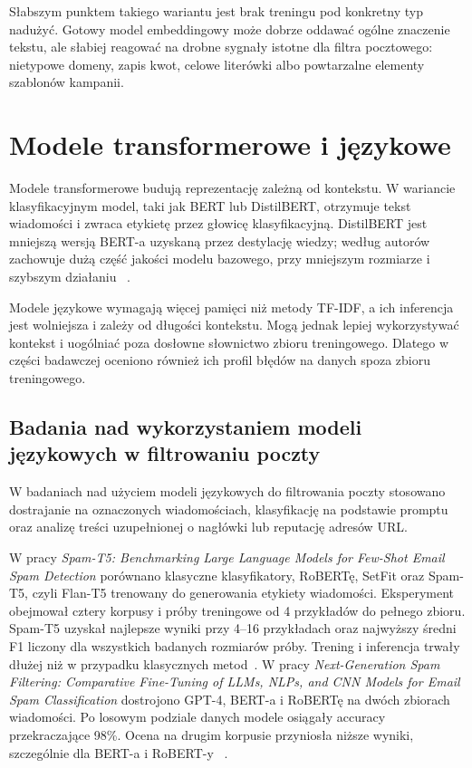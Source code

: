 Słabszym punktem takiego wariantu jest brak treningu pod konkretny typ nadużyć.
Gotowy model embeddingowy może dobrze oddawać ogólne znaczenie tekstu, ale
słabiej reagować na drobne sygnały istotne dla filtra pocztowego: nietypowe
domeny, zapis kwot, celowe literówki albo powtarzalne elementy szablonów
kampanii.

\section{Modele transformerowe i językowe}

Modele transformerowe budują reprezentację zależną od kontekstu. W wariancie
klasyfikacyjnym model, taki jak BERT lub DistilBERT, otrzymuje tekst wiadomości
i zwraca etykietę przez głowicę klasyfikacyjną. DistilBERT jest mniejszą wersją
BERT-a uzyskaną przez destylację wiedzy; według autorów zachowuje dużą część
jakości modelu bazowego, przy mniejszym rozmiarze i szybszym działaniu
~\autocite{sanh-distilbert}.

Modele językowe wymagają więcej pamięci niż metody TF-IDF, a ich inferencja jest
wolniejsza i zależy od długości kontekstu. Mogą jednak lepiej wykorzystywać
kontekst i uogólniać poza dosłowne słownictwo zbioru treningowego. Dlatego w
części badawczej oceniono również ich profil błędów na danych spoza zbioru
treningowego.

\subsection{Badania nad wykorzystaniem modeli językowych w filtrowaniu poczty}

W badaniach nad użyciem modeli językowych do filtrowania poczty stosowano
dostrajanie na oznaczonych wiadomościach, klasyfikację na podstawie promptu oraz
analizę treści uzupełnionej o nagłówki lub reputację adresów URL.

W pracy \emph{Spam-T5: Benchmarking Large Language Models for Few-Shot Email
Spam Detection} porównano klasyczne klasyfikatory, RoBERTę, SetFit oraz Spam-T5,
czyli Flan-T5 trenowany do generowania etykiety wiadomości. Eksperyment
obejmował cztery korpusy i próby treningowe od 4 przykładów do pełnego zbioru.
Spam-T5 uzyskał najlepsze wyniki przy 4--16 przykładach oraz najwyższy średni
F1 liczony dla wszystkich badanych rozmiarów próby. Trening i inferencja trwały
dłużej niż w przypadku klasycznych metod~\autocite{labonne-spam-t5-2023}.
W pracy \emph{Next-Generation Spam Filtering: Comparative Fine-Tuning of LLMs,
NLPs, and CNN Models for Email Spam Classification} dostrojono GPT-4, BERT-a i
RoBERTę na dwóch zbiorach wiadomości. Po losowym podziale danych modele osiągały
accuracy przekraczające 98\%. Ocena na drugim korpusie przyniosła niższe wyniki,
szczególnie dla BERT-a i RoBERT-y
~\autocite{roumeliotis-next-generation-spam-2024}.

